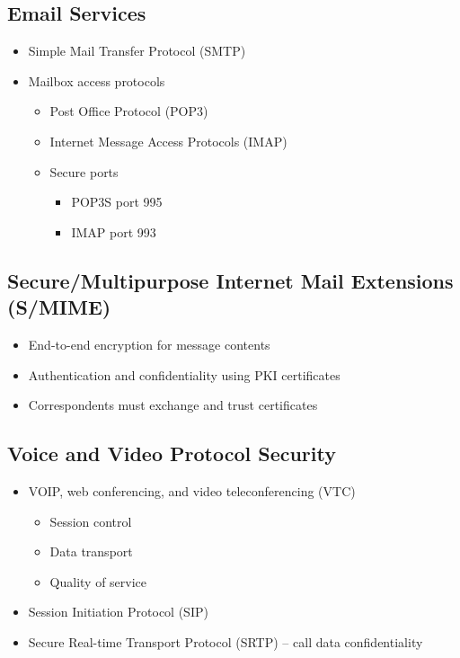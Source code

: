 	\subsection {Email Services}
		\begin{itemize}
			\item Simple Mail Transfer Protocol (SMTP)
			\item Mailbox access protocols
				\begin{itemize}
					\item Post Office Protocol (POP3)
					\item Internet Message Access Protocols (IMAP)
					\item Secure ports
						\begin{itemize}
							\item POP3S port 995
							\item IMAP port 993
						\end{itemize}
				\end{itemize}
		\end{itemize}
	\subsection {Secure/Multipurpose Internet Mail Extensions (S/MIME)}
		\begin{itemize}
			\item End-to-end encryption for message contents
			\item Authentication and confidentiality using PKI certificates
			\item Correspondents must exchange and trust certificates
		\end{itemize}
	\subsection {Voice and Video Protocol Security}
		\begin{itemize}
			\item VOIP, web conferencing, and video teleconferencing (VTC)
				\begin{itemize}
					\item Session control
					\item Data transport
					\item Quality of service
				\end{itemize}
			\item Session Initiation Protocol (SIP)
			\item Secure Real-time Transport Protocol (SRTP) -- call data confidentiality
		\end{itemize}

